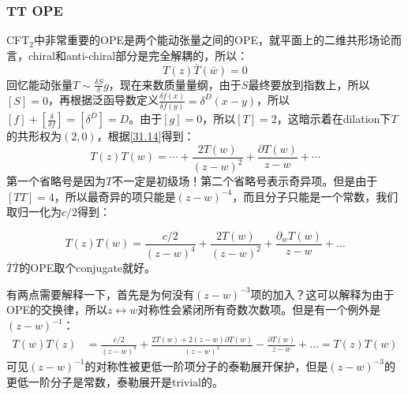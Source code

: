 \subsubsection{TT OPE}
CFT$_{2}$中非常重要的OPE是两个能动张量之间的OPE，就平面上的二维共形场论而言，chiral和anti-chiral部分是完全解耦的，所以：
\begin{equation}
	\boxed{
		T(z)\bar T(\bar w)=0
	}
\end{equation}
回忆能动张量$T\sim\frac{\delta S}\delta{g}$，现在来数质量量纲，由于$S$最终要放到指数上，所以$[S]=0$，再根据泛函导数定义$\frac{\delta f(x)}{\delta f(y)}=\delta^D(x-y)$，所以$[f]+\left[\frac{\delta }{\delta f}\right]=[\delta^D]=D$。由于$[g]=0$，所以$[T]=2$，这暗示着在dilation下$T$的共形权为$(2,0)$，根据\ref{31.14}得到：
\begin{equation}
	T(z)T(w)=\cdots+\frac{2T(w)}{(z-w)^2}+\frac{\partial T(w)}{z-w}+\cdots
\end{equation}
第一个省略号是因为$T$不一定是初级场！第二个省略号表示奇异项。但是由于$[TT]=4$，所以最奇异的项只能是$(z-w)^{-4}$，而且分子只能是一个常数，我们取归一化为$c/2$得到：
\begin{theorem}[TT OPE]
	\begin{equation}\label{TT}
		\boxed{
			T(z)T(w)=\frac{c/2}{(z-w)^4}+\frac{2T(w)}{(z-w)^2}+\frac{\partial_wT(w)}{z-w}+\ldots 
		}
	\end{equation}
	$\bar T\bar T$的OPE取个conjugate就好。
\end{theorem}
有两点需要解释一下，首先是为何没有$(z-w)^{-3}$项的加入？这可以解释为由于OPE的交换律，所以$z\leftrightarrow w$对称性会紧闭所有奇数次数项。但是有一个例外是$(z-w)^{-1}$：
\begin{equation}
	\begin{aligned}T(w)T(z)&=\frac{c/2}{(z-w)^4}+\frac{2T(w)+2(z-w)\partial T(w)}{(z-w)^2}-\frac{\partial T(w)}{z-w}+\ldots=T(z)T(w)\end{aligned}
\end{equation}
可见$(z-w)^{-1}$的对称性被更低一阶项分子的泰勒展开保护，但是$(z-w)^{-3}$的更低一阶分子是常数，泰勒展开是trivial的。

